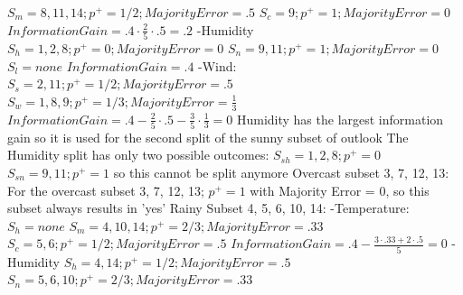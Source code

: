 \documentclass[12pt, fullpage,letterpaper]{article}
\begin{document}
\begin{enumerate}
\begin{enumerate}
	\newline $S_m=8, 11, 14; p^+=1/2; Majority Error=.5$
	\newline $S_c=9; p^+=1; Majority Error=0$
	\newline $Information Gain=.4 \cdot \frac{2}{5} \cdot .5=.2$
	\newline -Humidity
	\newline $S_h = 1, 2, 8; p^+=0; Majority Error=0$
	\newline $S_n=9, 11; p^+=1; Majority Error=0$
	\newline $S_l=none$
	\newline $Information Gain=.4$
	\newline -Wind:
	\newline $S_s = 2,11; p^+=1/2; Majority Error=.5$
	\newline $S_w=1, 8, 9; p^+=1/3; Majority Error=\frac{1}{3}$
	\newline $Information Gain=.4-\frac{2}{5}\cdot.5-\frac{3}{5}\cdot\frac{1}{3} = 0$
	\newline Humidity has the largest information gain so it is used for the second split of the sunny subset of outlook
	\newline
	\newline The Humidity split has only two possible outcomes: 
	\newline $S_{sh}=1, 2, 8; p^+ =0$
	\newline $S_{sn}=9, 11; p^+ =1$
	\newline so this cannot be split anymore
	\newline
	\newline Overcast subset 3, 7, 12, 13:
	\newline For the overcast subset 3, 7, 12, 13; $p^+=1$ with Majority Error = 0, so this subset always results in 'yes'
	\newline
	\newline Rainy Subset 4, 5, 6, 10, 14:
	\newline -Temperature:
	\newline $S_h = none$
	\newline $S_m=4, 10, 14; p^+=2/3; Majority Error=.33$
	\newline $S_c=5, 6; p^+=1/2; Majority Error=.5$
	\newline $Information Gain=.4-\frac{3\cdot.33+2\cdot.5}{5}=0$
	\newline -Humidity
	\newline $S_h = 4, 14; p^+=1/2; Majority Error=.5$
	\newline $S_n=5, 6, 10; p^+=2/3; Majority Error=.33$

\end{enumerate}
\end{enumerate}
\end{document}
